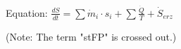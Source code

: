 Equation:  
\( \frac{dS}{dt} = \sum \dot{m}_i \cdot s_i + \sum \frac{\dot{Q}}{T} + \dot{S}_{erz} \)  

(Note: The term "stFP" is crossed out.)
